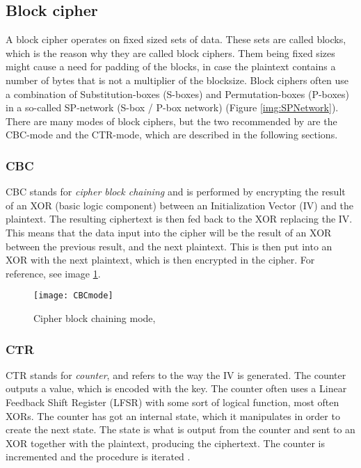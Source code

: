 \subsection{Block cipher}\label{sec:BlockCipher}
A block cipher operates on fixed sized sets of data. These sets are 
called blocks, which is the reason why they are called block ciphers. 
Them being fixed sizes might cause a need for padding of the blocks, in 
case the plaintext contains a number of bytes that is not a multiplier
of the blocksize. Block ciphers often use a combination of Substitution-boxes 
(S-boxes) and Permutation-boxes (P-boxes) in a so-called SP-network 
(S-box / P-box network) (Figure \ref{img:SPNetwork}). There are many modes 
of block ciphers, but the two recommended by \citet{Schneier:2003} are the 
CBC-mode and the CTR-mode, which are described in the following sections.

\subsubsection{CBC}
CBC stands for \emph{cipher block chaining} and is performed by 
encrypting the result of an XOR (basic logic component) between 
an Initialization Vector (IV) and the plaintext. The resulting 
ciphertext is then fed back to the XOR replacing the IV.
This means that the data input into the cipher will be the result of 
an XOR between the previous result, and the next plaintext. This is 
then put into an XOR with the next plaintext, which is then encrypted 
in the cipher. For reference, see image \ref{img:CBCmode}. 
\citep[pp. 109--111]{Stinson:2006}

\begin{figure}
  \begin{center}
   \texttt{[image: CBCmode]}
  \end{center}
  \caption{Cipher block chaining mode, \citep{CBCmode:2014}}
  \label{img:CBCmode}
\end{figure}

\subsubsection{CTR}
CTR stands for \emph{counter}, and refers to the way the IV is 
generated. The counter outputs a value, which is encoded with the key. 
The counter often uses a Linear Feedback Shift Register (LFSR) with some 
sort of logical function, most often XORs. The counter has got an internal
state, which it manipulates in order to create the next state. The state
is what is output from the counter and sent to an XOR together with the 
plaintext, producing the ciphertext. The counter is incremented and the 
procedure is iterated \citep[p. 111]{Stinson:2006}.

